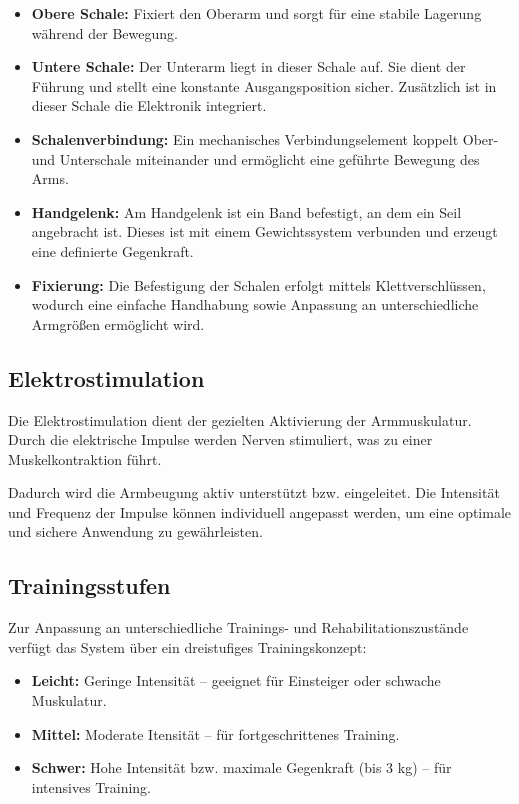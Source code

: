 \documentclass{article}
\begin{document}
\begin{itemize}
\item \textbf{Obere Schale:}  
Fixiert den Oberarm und sorgt für eine stabile Lagerung während der Bewegung.

\item \textbf{Untere Schale:}  
Der Unterarm liegt in dieser Schale auf. Sie dient der Führung und stellt eine konstante Ausgangsposition sicher. Zusätzlich ist in dieser Schale die Elektronik integriert.

\item \textbf{Schalenverbindung:}  
Ein mechanisches Verbindungselement koppelt Ober- und Unterschale miteinander und ermöglicht eine geführte Bewegung des Arms.

\item \textbf{Handgelenk:}  
Am Handgelenk ist ein Band befestigt, an dem ein Seil angebracht ist. Dieses ist mit einem Gewichtssystem verbunden und erzeugt eine definierte Gegenkraft.

\item \textbf{Fixierung:}  
Die Befestigung der Schalen erfolgt mittels Klettverschlüssen, wodurch eine einfache Handhabung sowie Anpassung an unterschiedliche Armgrößen ermöglicht wird.
\end{itemize}

\subsection{Elektrostimulation}

Die Elektrostimulation dient der gezielten Aktivierung der Armmuskulatur. Durch die elektrische Impulse werden Nerven stimuliert, was zu einer Muskelkontraktion führt.

Dadurch wird die Armbeugung aktiv unterstützt bzw. eingeleitet. Die Intensität und Frequenz der Impulse können individuell angepasst werden, um eine optimale und sichere Anwendung zu gewährleisten.

\subsection{Trainingsstufen}

Zur Anpassung an unterschiedliche Trainings- und Rehabilitationszustände verfügt das System über ein dreistufiges Trainingskonzept:

\begin{itemize}
\item \textbf{Leicht:}  
Geringe Intensität – geeignet für Einsteiger oder schwache Muskulatur.

\item \textbf{Mittel:}  
Moderate Itensität – für fortgeschrittenes Training.

\item \textbf{Schwer:}  
Hohe Intensität bzw. maximale Gegenkraft (bis 3 kg) – für intensives Training.
\end{itemize}
\end{document}
